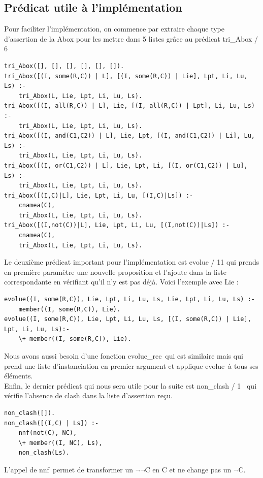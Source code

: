 \documentclass{article}
\begin{document}
\subsection{Prédicat utile à l'implémentation}
Pour faciliter l'implémentation, on commence par extraire chaque type d'assertion de la Abox pour les mettre dans 5 listes grâce au prédicat \color{blue} tri\_Abox / 6 \color{black}
\begin{verbatim}
tri_Abox([], [], [], [], [], []).
tri_Abox([(I, some(R,C)) | L], [(I, some(R,C)) | Lie], Lpt, Li, Lu, Ls) :-
    tri_Abox(L, Lie, Lpt, Li, Lu, Ls).
tri_Abox([(I, all(R,C)) | L], Lie, [(I, all(R,C)) | Lpt], Li, Lu, Ls) :-
    tri_Abox(L, Lie, Lpt, Li, Lu, Ls).
tri_Abox([(I, and(C1,C2)) | L], Lie, Lpt, [(I, and(C1,C2)) | Li], Lu, Ls) :-
    tri_Abox(L, Lie, Lpt, Li, Lu, Ls).
tri_Abox([(I, or(C1,C2)) | L], Lie, Lpt, Li, [(I, or(C1,C2)) | Lu], Ls) :-
    tri_Abox(L, Lie, Lpt, Li, Lu, Ls).
tri_Abox([(I,C)|L], Lie, Lpt, Li, Lu, [(I,C)|Ls]) :-
    cnamea(C),
    tri_Abox(L, Lie, Lpt, Li, Lu, Ls).
tri_Abox([(I,not(C))|L], Lie, Lpt, Li, Lu, [(I,not(C))|Ls]) :-
    cnamea(C),
    tri_Abox(L, Lie, Lpt, Li, Lu, Ls).
\end{verbatim}

Le deuxième prédicat important pour l'implémentation est \color{blue} evolue / 11 \color{black} qui prends en première paramètre une nouvelle proposition et l'ajoute dans la liste correspondante en vérifiant qu'il n'y est pas déjà. Voici l'exemple avec Lie :
\begin{verbatim}
evolue((I, some(R,C)), Lie, Lpt, Li, Lu, Ls, Lie, Lpt, Li, Lu, Ls) :-
    member((I, some(R,C)), Lie).
evolue((I, some(R,C)), Lie, Lpt, Li, Lu, Ls, [(I, some(R,C)) | Lie], Lpt, Li, Lu, Ls):-
    \+ member((I, some(R,C)), Lie).
\end{verbatim}
Nous avons aussi besoin d'une fonction \color{blue}evolue\_rec\color{black}\ qui est similaire mais qui prend une liste d'instanciation en premier argument et applique \color{blue}evolue\color{black}\ à tous ses éléments.\\


Enfin, le dernier prédicat qui nous sera utile pour la suite est \color{blue} non\_clash / 1 \color{black}\ qui vérifie l'absence de clash dans la liste d'assertion reçu.
\begin{verbatim}
non_clash([]).
non_clash([(I,C) | Ls]) :-
    nnf(not(C), NC),
    \+ member((I, NC), Ls),
    non_clash(Ls).
\end{verbatim}
L'appel de \color{blue}nnf\color{black}\ permet de transformer un $\neg\neg$C en C et ne change pas un $\neg$C.
\end{document}
